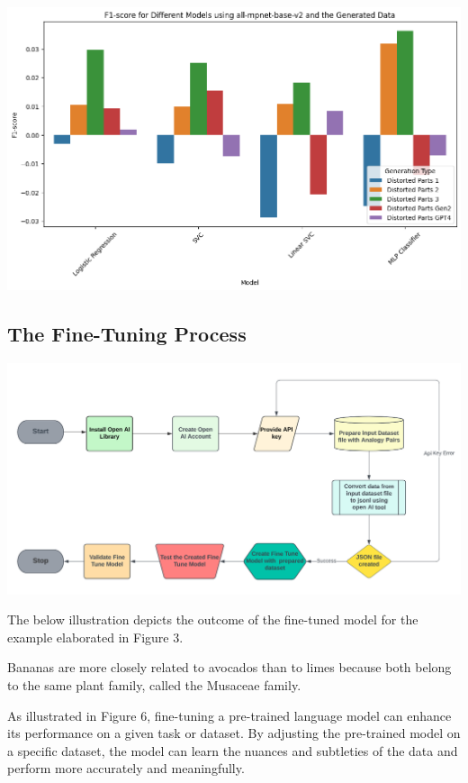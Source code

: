 \documentclass[a0,landscape]{a0poster}
\begin{document}
\begin{multicols}{4}
\begin{center}
\includegraphics[width=0.60\linewidth]{figures/generatedDataDiffDiff.png}
\end{center}\vspace{1cm}

\color{Teal}
\subsection*{The Fine-Tuning Process}
\begin{center}
\includegraphics[width=0.99\linewidth]{FlowChart.png}
\end{center}\vspace{1cm}

\color{black}
The below illustration depicts the outcome of the fine-tuned model for the example elaborated in Figure 3.

Bananas are more closely related to avocados than to limes because both belong to the same plant family, called the Musaceae family.
\vspace{0.5cm}

As illustrated in Figure 6, fine-tuning a pre-trained language model can enhance its performance on a given task or dataset. By adjusting the pre-trained model on a specific dataset, the model can learn the nuances and subtleties of the data and perform more accurately and meaningfully.
\vspace{0.5cm}


\end{multicols}
\end{document}
